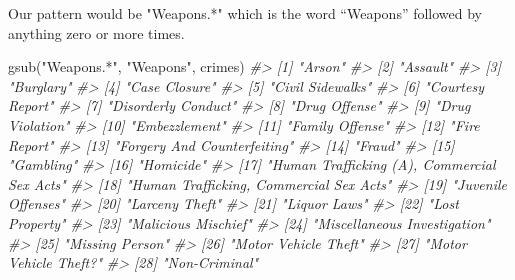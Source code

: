 \documentclass[
  12pt,
  openany]{book}
\newenvironment{Shaded}{\begin{snugshade}}{\end{snugshade}}
\newcommand{\CommentTok}[1]{\textcolor[rgb]{0.37,0.37,0.37}{\textit{#1}}}
\newcommand{\FunctionTok}[1]{\textcolor[rgb]{0,0,0}{#1}}
\newcommand{\NormalTok}[1]{#1}
\newcommand{\StringTok}[1]{\textcolor[rgb]{0.5,0.5,0.5}{#1}}
\begin{document}
Our pattern would be "Weapons.*" which is the word ``Weapons'' followed by anything zero or more times.

\begin{Shaded}
\begin{Highlighting}[]
\FunctionTok{gsub}\NormalTok{(}\StringTok{"Weapons.*"}\NormalTok{, }\StringTok{"Weapons"}\NormalTok{, crimes)}
\CommentTok{\#\textgreater{}  [1] "Arson"                                     }
\CommentTok{\#\textgreater{}  [2] "Assault"                                   }
\CommentTok{\#\textgreater{}  [3] "Burglary"                                  }
\CommentTok{\#\textgreater{}  [4] "Case Closure"                              }
\CommentTok{\#\textgreater{}  [5] "Civil Sidewalks"                           }
\CommentTok{\#\textgreater{}  [6] "Courtesy Report"                           }
\CommentTok{\#\textgreater{}  [7] "Disorderly Conduct"                        }
\CommentTok{\#\textgreater{}  [8] "Drug Offense"                              }
\CommentTok{\#\textgreater{}  [9] "Drug Violation"                            }
\CommentTok{\#\textgreater{} [10] "Embezzlement"                              }
\CommentTok{\#\textgreater{} [11] "Family Offense"                            }
\CommentTok{\#\textgreater{} [12] "Fire Report"                               }
\CommentTok{\#\textgreater{} [13] "Forgery And Counterfeiting"                }
\CommentTok{\#\textgreater{} [14] "Fraud"                                     }
\CommentTok{\#\textgreater{} [15] "Gambling"                                  }
\CommentTok{\#\textgreater{} [16] "Homicide"                                  }
\CommentTok{\#\textgreater{} [17] "Human Trafficking (A), Commercial Sex Acts"}
\CommentTok{\#\textgreater{} [18] "Human Trafficking, Commercial Sex Acts"    }
\CommentTok{\#\textgreater{} [19] "Juvenile Offenses"                         }
\CommentTok{\#\textgreater{} [20] "Larceny Theft"                             }
\CommentTok{\#\textgreater{} [21] "Liquor Laws"                               }
\CommentTok{\#\textgreater{} [22] "Lost Property"                             }
\CommentTok{\#\textgreater{} [23] "Malicious Mischief"                        }
\CommentTok{\#\textgreater{} [24] "Miscellaneous Investigation"               }
\CommentTok{\#\textgreater{} [25] "Missing Person"                            }
\CommentTok{\#\textgreater{} [26] "Motor Vehicle Theft"                       }
\CommentTok{\#\textgreater{} [27] "Motor Vehicle Theft?"                      }
\CommentTok{\#\textgreater{} [28] "Non{-}Criminal"                              }

\end{Highlighting}
\end{Shaded}
\end{document}
